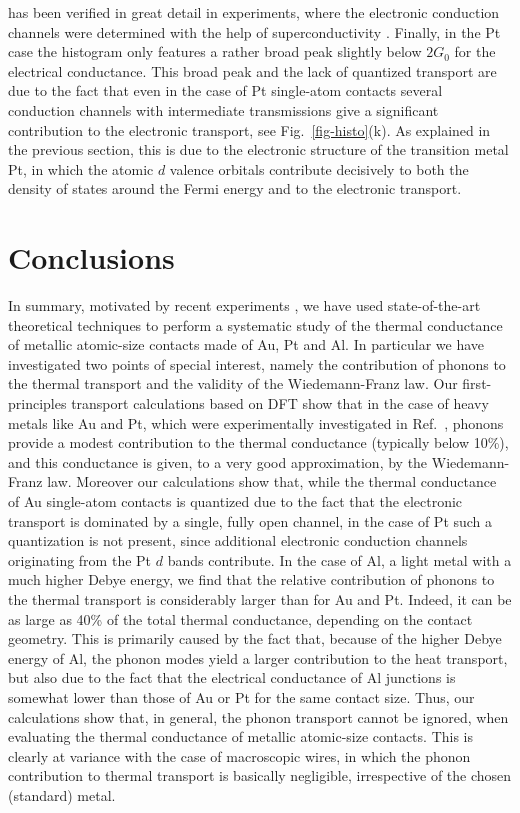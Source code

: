 \documentclass[aps,amsmath,amssymb,twocolumn,showpacs]{revtex4-1}
\begin{document}
has been verified in great detail in experiments, where the electronic
conduction channels were determined with the help of superconductivity
\cite{Scheer1997,Scheer1998,Schirm2013}. Finally, in the Pt case the histogram
only features a rather broad peak slightly below $2G_0$ for the electrical
conductance. This broad peak and the lack of quantized transport are due to
the fact that even in the case of Pt single-atom contacts several conduction
channels with intermediate transmissions give a significant contribution to
the electronic transport, see Fig.~\ref{fig-histo}(k). As explained in the
previous section, this is due to the electronic structure of the transition
metal Pt, in which the atomic $d$ valence orbitals contribute
decisively to both the density of states around the Fermi energy and to the
electronic transport.

\section{Conclusions} \label{sec-Conclusions}

In summary, motivated by recent experiments \cite{Cui2017,Mosso2017}, we have
used state-of-the-art theoretical techniques to perform a systematic study of
the thermal conductance of metallic atomic-size contacts made of Au, Pt and
Al. In particular we have investigated two points of special
interest, namely the contribution of phonons to the thermal transport and the
validity of the Wiedemann-Franz law.  Our first-principles transport
calculations based on DFT show that in the case of heavy metals like Au and
Pt, which were experimentally investigated in Ref.~,
phonons provide a modest contribution to the thermal conductance (typically
below 10\%), and this conductance is given, to a very good approximation, by
the Wiedemann-Franz law. Moreover our calculations show that, while the
thermal conductance of Au single-atom contacts is quantized due to the fact
that the electronic transport is dominated by a single, fully open channel, in
the case of Pt such a quantization is not present, since additional electronic
conduction channels originating from the Pt $d$ bands contribute. In the case
of Al, a light metal with a much higher Debye energy, we find that the
relative contribution of phonons to the thermal transport is considerably
larger than for Au and Pt. Indeed, it can be as large as 40\% of the total
thermal conductance, depending on the contact geometry. This is primarily 
caused by the fact that, because of the higher Debye energy of Al, the phonon 
modes yield a larger contribution to the heat transport, but also due to the 
fact that the electrical conductance of Al junctions is somewhat lower than 
those of Au or Pt for the same contact size. Thus, our calculations show that, 
in general, the phonon transport cannot be ignored, when evaluating the thermal
conductance of metallic atomic-size contacts. This is clearly at variance with
the case of macroscopic wires, in which the phonon contribution to thermal
transport is basically negligible, irrespective of the chosen (standard)
metal.
\end{document}
